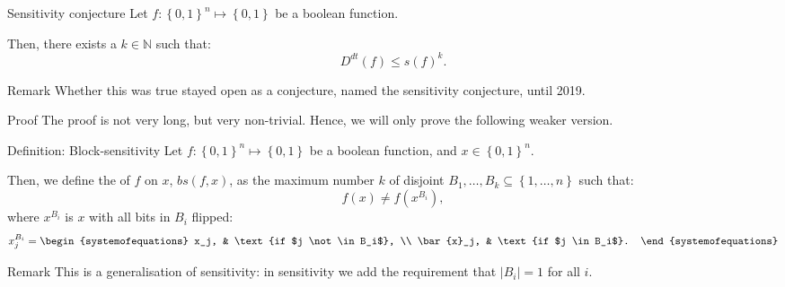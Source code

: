 \documentclass[a4paper]{article}
\begin{document}
\begin{parag}{Sensitivity conjecture}
    Let $f: \left\{0, 1\right\}^n \mapsto \left\{0, 1\right\}$ be a boolean function.

    Then, there exists a $k \in \mathbb{N}$ such that: 
    \[D^{dt}\left(f\right) \leq s\left(f\right)^k.\]

    \begin{subparag}{Remark}
        Whether this was true stayed open as a conjecture, named the sensitivity conjecture, until 2019.
    \end{subparag}

    \begin{subparag}{Proof}
        The proof is not very long, but very non-trivial. Hence, we will only prove the following weaker version.
    \end{subparag}
\end{parag}

\begin{parag}{Definition: Block-sensitivity}
    Let $f: \left\{0, 1\right\}^n \mapsto \left\{0, 1\right\}$ be a boolean function, and $x \in \left\{0, 1\right\}^n$.

    Then, we define the  of $f$ on $x$, $bs\left(f, x\right)$, as the maximum number $k$ of disjoint $B_1, \ldots, B_k \subseteq \left\{1, \ldots, n\right\}$ such that: 
    \[f\left(x\right) \neq f\left(x^{B_i}\right),\]
    where $x^{B_i}$ is $x$ with all bits in $B_i$ flipped:
    \[x^{B_i}_j = \begin{systemofequations} x_j, & \text{if $j \not \in B_i$}, \\ \bar{x}_j, & \text{if $j \in B_i$}. \end{systemofequations}\]

    \begin{subparag}{Remark}
        This is a generalisation of sensitivity: in sensitivity we add the requirement that $\left|B_i\right| = 1$ for all $i$.
    \end{subparag}
\end{parag}
\end{document}
